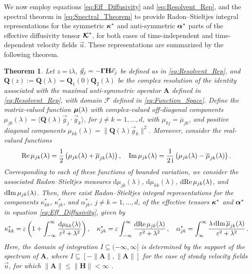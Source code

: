 \documentclass[11pt]{amsart}
\newcommand{\I}{\mathrm{i}}
\renewcommand{\d}{\mathrm{d}}
\newcommand{\Hb}{\mathbf{H}}
\newcommand{\Ab}{\mathbf{A}}
\newcommand{\Qb}{\mathbf{Q}}
\newcommand\Kbc{\mbox{\boldmath${\mathcal{K}}$}}
\newcommand{\Fs}{\mathscr{F}}
\newcommand\bmu{\mbox{\boldmath${\mu}$}}
\newcommand\balpha{\mbox{\boldmath${\alpha}$}}
\newcommand\bkappa{\mbox{\boldmath${\kappa}$}}
\newcommand\bGamma{\mbox{\boldmath${\Gamma}$}}
\newtheorem{theorem}{Theorem}[section]
\begin{document}
We now employ equations \eqref{eq:Eff_Diffusivity} and
\eqref{eq:Resolvent_Rep}, and the spectral 
theorem in \eqref{eq:Spectral_Theorem} to provide Radon--Stieltjes
integral representations for the symmetric $\bkappa^*$ and
anti-symmetric $\balpha^*$ parts of the effective diffusivity tensor
$\Kbc^*$, for both cases of time-independent and time-dependent
velocity fields $\vec{u}$. These representations are summarized by the
following theorem.
%
\begin{theorem}\label{thm:Integral_Reps}
Let $z=\I\lambda$, $\vec{g}_j=-\bGamma\Hb\vec{e}_j$ be defined as
in \eqref{eq:Resolvent_Rep}, and $\Qb(z):=\Qb(\lambda)=\Qb_1(0)\Qb_2(\lambda)$ be
the complex resolution of the identity associated with the maximal
anti-symmetric operator $\Ab$ defined in \eqref{eq:Resolvent_Rep}, with
domain $\Fs$ defined in \eqref{eq:Function_Space}. Define the
matrix-valued function $\bmu(\lambda)$ with complex-valued off-diagonal
components $\mu_{jk}(\lambda)=\langle\Qb(\lambda)\vec{g}_j\cdot\vec{g}_k\rangle$, for $j\neq k=1,\ldots,d$,
with $\mu_{kj}=\overline{\mu}_{jk}$, and positive diagonal components
$\mu_{kk}(\lambda)=\|\Qb(\lambda)\vec{g}_k\|^2$.  Moreover, consider the real-valued
functions   
%
\begin{align}
  {\rm Re}\,\mu_{jk}(\lambda)
         =\frac{1}{2}\left(\mu_{jk}(\lambda)+\overline{\mu}_{jk}(\lambda)\right), \quad
  {\rm Im}\,\mu_{jk}(\lambda)
         =\frac{1}{2\,\I}\left(\mu_{jk}(\lambda)-\overline{\mu}_{jk}(\lambda)\right).
\end{align}
%
Corresponding to each of these functions of bounded variation, we
consider the associated 
Radon--Stieltjes measures $\d\mu_{jk}(\lambda)$, $\d\mu_{kk}(\lambda)$, $\d{\rm
  Re}\,\mu_{jk}(\lambda)$, and $\d{\rm Im}\,\mu_{jk}(\lambda)$. Then, there exist 
Radon--Stieltjes integral representations for the components
$\kappa^*_{kk}$, $\kappa^*_{jk}$, and $\alpha^*_{jk}$, $j\neq k=1,\ldots,d$, of the effective tensors
$\bkappa^*$ and $\balpha^*$ in equation \eqref{eq:Eff_Diffusivity},
given by         
%
\begin{align}\label{eq:Integral_Rep_kappa*}
  \kappa^*_{kk}=\varepsilon\left(1+\int_{-\infty}^\infty\frac{\d\mu_{kk}(\lambda)}{\varepsilon^2+\lambda^2}\right),
  \quad
  \kappa^*_{jk}=\varepsilon\int_{-\infty}^\infty\frac{\d{\rm Re}\,\mu_{jk}(\lambda)}{\varepsilon^2+\lambda^2}\,,
  \quad
  \alpha^*_{jk}=\int_{\infty}^\infty\frac{\lambda\,\d{\rm Im}\,\overline{\mu}_{jk}(\lambda)}{\varepsilon^2+\lambda^2}\,.       
\end{align}
%
Here, the domain of integration $I\subseteq(-\infty,\infty]$ is
determined by the support of the spectrum of $\Ab$, where  
$I\subseteq[-\|\Ab\|,\|\Ab\|]$ for the case of steady velocity fields
$\vec{u}$, for which $\|\Ab\|\leq\|\Hb\|<\infty$ \cite{Reed-1980}. 
%
\end{theorem}
\end{document}

